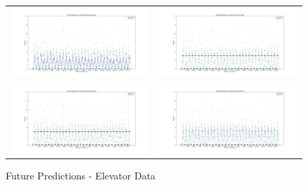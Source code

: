 \begin{figure}
  \begin{tabular}{cc}
    {\includegraphics[width = 3in]{images/results/Future_elevator_Duckett.png}} &
    {\includegraphics[width = 3in]{images/results/Future_elevator_FreMEn.png}} \\
    {\includegraphics[width = 3in]{images/results/Future_elevator_Gaussian.png}} &
    {\includegraphics[width = 3in]{images/results/Future_elevator_HyT-EM.png}} \\
  \end{tabular}
  \caption{Future Predictions - Elevator Data}
  \label{figure:Future_Predictions_-_Elevator_Data}
\end{figure}

